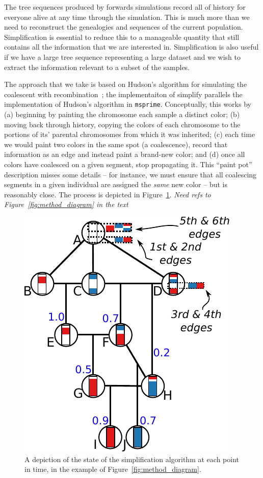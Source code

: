 \documentclass{article}
\newcommand{\msprime}{\texttt{msprime}}
\newcommand{\jda}[1]{{\em \color{cyan} #1}}
\begin{document}
The tree sequences produced by forwards simulations 
record all of history for everyone alive at any time through the simulation.
This is much more than we need to reconstruct the genealogies and sequences
of the current population.
Simplification is essential to reduce this 
to a manageable quantity that still contains all
the information that we are interested in. 
Simplification is also useful if we have a
large tree sequence representing a large dataset and we wish to extract the
information relevant to a subset of the samples.

The approach that we take is based on Hudson's algorithm for simulating
the coalescent with recombination~\citep{hudson1983properties,kelleher2016efficient};
the implementaiton of simplify parallels the implementation of Hudson's algorithm in \msprime.
Conceptually, this works by 
(a) beginning by painting the chromosome each sample a distinct color;
(b) moving back through history, 
copying the colors of each chromosome to the portions of its' parental chromosomes
from which it was inherited;
(c) each time we would paint two colors in the same spot (a coalescence),
record that information as an edge and instead paint a brand-new color; 
and
(d) once all colors have coalesced on a given segment,
stop propagating it.
This ``paint pot'' description misses some details --
for instance, we must ensure that all coalescing segments in a given individual
are assigned the \emph{same} new color --
but is reasonably close.
The process is depicted in Figure~\ref{fig:simplify_state}.
\jda{Need refs to Figure~\ref{fig:method_diagram} in the text}

\begin{figure}
    \begin{center}
        \includegraphics{simplify-state-diagram}
    \end{center}
    \caption{
        A depiction of the state of the simplification algorithm
        at each point in time,
        in the example of Figure~\ref{fig:method_diagram}.
        \label{fig:simplify_state}
    }
\end{figure}
\end{document}
